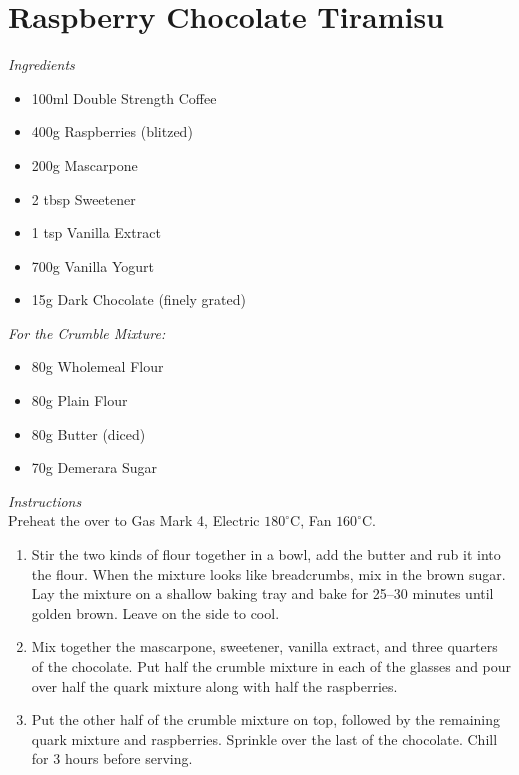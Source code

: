\documentclass{article}
\newcommand{\recipe}{%
    \newpage\lhead{}\chead{}\rhead{}\lfoot{}\rfoot{}\section}
\newcommand{\serves}[1]{%
    \chead{Serves #1}}
\newcommand{\vegetarian}{%
    \rhead{V}}
\newcommand{\ingredients}[1][\Large\emph{Ingredients}]{%
    \emph{#1}\\}
\newcommand{\instructions}[1][\Large\emph{Instructions}]{%
    \emph{#1}\\}
\newcommand{\temp}[1]{%
    $#1^\circ$C}
\begin{document}
\recipe{Raspberry Chocolate Tiramisu}
\serves{4}
\vegetarian

\begin{multicols}{2}
\ingredients
\begin{itemize}
    \item 100ml Double Strength Coffee
    \item 400g Raspberries (blitzed)
    \item 200g Mascarpone
    \item 2 tbsp Sweetener
    \item 1 tsp Vanilla Extract
    \item 700g Vanilla Yogurt
    \item 15g Dark Chocolate (finely grated)
\end{itemize}
\columnbreak
\ingredients[For the Crumble Mixture:]
\begin{itemize}
    \item 80g Wholemeal Flour
    \item 80g Plain Flour
    \item 80g Butter (diced)
    \item 70g Demerara Sugar
\end{itemize}
\end{multicols}

\instructions
Preheat the over to Gas Mark 4, Electric \temp{180}, Fan \temp{160}.
\begin{enumerate}
    \item Stir the two kinds of flour together in a bowl, add the butter and rub it into the flour. When the mixture looks like breadcrumbs, mix in the brown sugar. Lay the mixture on a shallow baking tray and bake for 25--30 minutes until golden brown. Leave on the side to cool.
    \item Mix together the mascarpone, sweetener, vanilla extract, and three quarters of the chocolate. Put half the crumble mixture in each of the glasses and pour over half the quark mixture along with half the raspberries.
    \item Put the other half of the crumble mixture on top, followed by the remaining quark mixture and raspberries. Sprinkle over the last of the chocolate. Chill for 3 hours before serving.
\end{enumerate}
\end{document}
